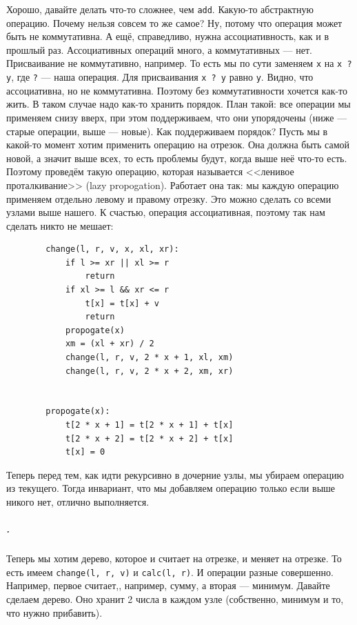 \documentclass{article}
\newcommand{\pseudo}{PseudoLexer.py:PseudoLexer -x}
\newcommand{\pseudocode}[1]{\texttt{#1}}
\begin{document}
    Хорошо, давайте делать что-то сложнее, чем \pseudocode{add}. Какую-то абстрактную операцию. Почему нельзя совсем то же самое? Ну, потому что операция может быть не коммутативна. А ещё, справедливо, нужна ассоциативность, как и в прошлый раз. Ассоциативных операций много, а коммутативных --- нет. Присваивание не коммутативно, например. То есть мы по сути заменяем \pseudocode{x} на \pseudocode{x ? y}, где \pseudocode{?} --- наша операция. Для присваивания \pseudocode{x ? y} равно \pseudocode{y}. Видно, что ассоциативна, но не коммутативна. Поэтому без коммутативности хочется как-то жить. В таком случае надо как-то хранить порядок. План такой: все операции мы применяем снизу вверх, при этом поддерживаем, что они упорядочены (ниже --- старые операции, выше --- новые). Как поддерживаем порядок? Пусть мы в какой-то момент хотим применить операцию на отрезок. Она должна быть самой новой, а значит выше всех, то есть проблемы будут, когда выше неё что-то есть. Поэтому проведём такую операцию, которая называется <<ленивое проталкивание>> (lazy propogation). Работает она так: мы каждую операцию применяем отдельно левому и правому отрезку. Это можно сделать со всеми узлами выше нашего. К счастью, операция ассоциативная, поэтому так нам сделать никто не мешает:
    \begin{verbatim}
        change(l, r, v, x, xl, xr):
            if l >= xr || xl >= r
                return
            if xl >= l && xr <= r
                t[x] = t[x] + v
                return
            propogate(x)
            xm = (xl + xr) / 2
            change(l, r, v, 2 * x + 1, xl, xm)
            change(l, r, v, 2 * x + 2, xm, xr)


        propogate(x):
            t[2 * x + 1] = t[2 * x + 1] + t[x]
            t[2 * x + 2] = t[2 * x + 2] + t[x]
            t[x] = 0
    \end{verbatim}
    Теперь перед тем, как идти рекурсивно в дочерние узлы, мы убираем операцию из текущего. Тогда инвариант, что мы добавляем операцию только если выше никого нет, отлично выполняется.
    \subparagraph{.}
    Теперь мы хотим дерево, которое и считает на отрезке, и меняет на отрезке. То есть имеем \pseudocode{change(l, r, v)} и \pseudocode{calc(l, r)}. И операции разные совершенно. Например, первое считает,, например, сумму, а вторая --- минимум. Давайте сделаем дерево. Оно хранит 2 числа в каждом узле (собственно, минимум и то, что нужно прибавить).
\end{document}
